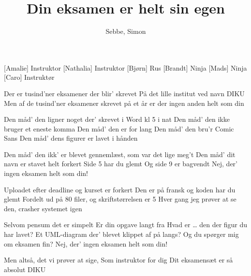 \documentclass[a4paper,11pt]{article}
\title{Din eksamen er helt sin egen}
\author{Sebbe, Simon}
\begin{document}
\maketitle

\begin{roles}
[Amalie] Instruktor
[Nathalia] Instruktor
[Bjørn] Rus
[Brandt] Ninja
[Mads] Ninja
[Caro] Instruktør
\end{roles}

\begin{song}
%
Der er tusind'ner eksamener der blir' skrevet
På det lille institut ved navn DIKU
Men af de tusind'ner eksamener
skrevet på et år
er der ingen anden helt som din

 Den måd' den ligner noget der' skrevet i Word kl 5 i nat
 Den måd' den ikke bruger et eneste komma
 Den måd' den er for lang
 Den måd' den bru'r Comic Sans
 Den måd' dens figurer er lavet i hånden

 Den måd' den ikk' er blevet gennemlæst, som var det lige meg't
 Den måd' dit navn er stavet helt forkert
 Side 5 har du glemt
 Og side 9 er bagvendt
 Nej, der' ingen eksamen helt som din!

 Uploadet efter deadline og kurset er forkert
 Den er på fransk og koden har du glemt
 Fordelt ud på 80 filer, og skriftstørrelsen er 5
 Hver gang jeg prøver at se den, crasher systemet igen

 Selvom pensum det er simpelt
Er din opgave langt fra
 Hvad er … den der figur du har lavet?
 Et UML-diagram
 der' blevet klippet af på langs?
 Og du spørger mig om eksamen fin?
 Nej, der' ingen eksamen helt som din!

 Men altså, det vi prøver at sige,
 Som instruktor for dig
 Dit eksamensæt er så absolut
DIKU


\end{song}
\end{document}
